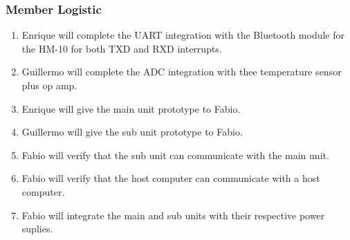 \subsubsection{Member Logistic}
\begin{enumerate}
  \item Enrique will complete the UART integration with the Bluetooth module for the HM-10 for both TXD and RXD interrupts.
  \item Guillermo will complete the ADC integration with thee temperature sensor plus op amp.
  \item Enrique will give the main unit prototype to Fabio.
  \item Guillermo will give the sub unit prototype to Fabio.
  \item Fabio will verify that the sub unit can communicate with the main unit.
  \item Fabio will verify that the host computer can communicate with a host computer.
  \item Fabio will integrate the main and sub units with their respective power suplies.
\end{enumerate}
